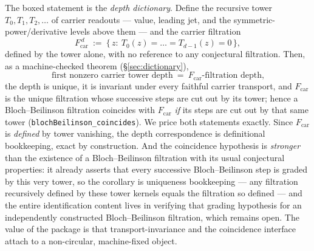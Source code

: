 \documentclass[11pt]{article}
\theoremstyle{definition}
\theoremstyle{remark}
\newcommand{\Fcar}{F_{\mathrm{car}}}
\begin{document}
The boxed statement is the \emph{depth dictionary}. Define the recursive tower
$T_0,T_1,T_2,\dots$ of carrier readouts --- value, leading jet, and the
symmetric-power/derivative levels above them --- and the carrier filtration
\[
  \Fcar^{\,d}\ :=\ \{\,z:\ T_0(z)=\dots=T_{d-1}(z)=0\,\},
\]
defined by the tower alone, with no reference to any conjectural filtration.
Then, as a machine-checked theorem (\S\ref{sec:dictionary}),
\[
  \boxed{\ \text{first nonzero carrier tower depth}\ =\ \Fcar\text{-filtration depth,}\ }
\]
the depth is unique, it is invariant under every faithful carrier transport,
and $\Fcar$ is the unique filtration whose successive steps are cut out by its
tower; hence a Bloch--Beilinson filtration coincides with $\Fcar$ \emph{if}
its steps are cut out by that same tower
(\texttt{blochBeilinson\_coincides}). We price both statements exactly. Since
$\Fcar$ is \emph{defined} by tower vanishing, the depth correspondence is
definitional bookkeeping, exact by construction. And the coincidence hypothesis
is \emph{stronger} than the existence of a Bloch--Beilinson filtration with
its usual conjectural properties: it already asserts that every successive
Bloch--Beilinson step is graded by this very tower, so the corollary is
uniqueness bookkeeping --- any filtration recursively defined by these tower
kernels equals the filtration so defined --- and the entire identification
content lives in verifying that grading hypothesis for an independently
constructed Bloch--Beilinson filtration, which remains open. The value of the
package is that transport-invariance and the coincidence interface attach to a
non-circular, machine-fixed object.
\end{document}
